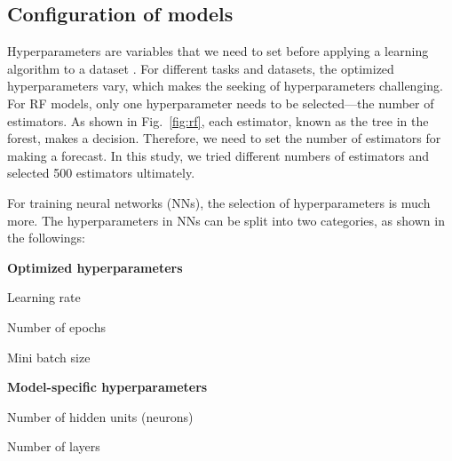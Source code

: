 \subsection{Configuration of models}
Hyperparameters are variables that we need to set before applying a learning algorithm to a dataset \citep{agrawalHyperparametersDeepLearning2019}. For different tasks and datasets, the optimized hyperparameters vary, which makes the seeking of hyperparameters challenging. For RF models, only one hyperparameter needs to be selected---the number of estimators. As shown in Fig.~\ref{fig:rf}, each estimator, known as the tree in the forest, makes a decision. Therefore, we need to set the number of estimators for making a forecast. In this study, we tried different numbers of estimators and selected 500 estimators ultimately.

For training neural networks (NNs), the selection of hyperparameters is much more. The hyperparameters in NNs can be split into two categories, as shown in the followings:

\noindent
\textbf{Optimized hyperparameters}\\
\begin{myenumerate}
    \item Learning rate
    \item Number of epochs
    \item Mini batch size
\end{myenumerate}

\noindent
\textbf{Model-specific hyperparameters}\\
\begin{myenumerate}
    \item Number of hidden units (neurons)
    \item Number of layers
\end{myenumerate}

